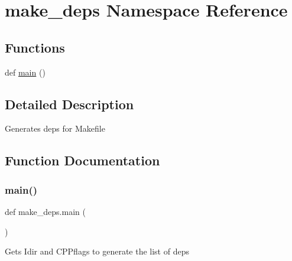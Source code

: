 \hypertarget{namespacemake__deps}{}\section{make\+\_\+deps Namespace Reference}
\label{namespacemake__deps}
\subsection*{Functions}
\begin{DoxyCompactItemize}
\item 
def \mbox{\hyperlink{namespacemake__deps_aba7f71c9c941e17bcbb41d4e5c46fef6}{main}} ()
\end{DoxyCompactItemize}


\subsection{Detailed Description}
\begin{DoxyVerb}Generates deps for Makefile
\end{DoxyVerb}
 

\subsection{Function Documentation}
\mbox{\label{namespacemake__deps_aba7f71c9c941e17bcbb41d4e5c46fef6}} 
\subsubsection{\texorpdfstring{main()}{main()}}
{\footnotesize\ttfamily def make\+\_\+deps.\+main (\begin{DoxyParamCaption}{ }\end{DoxyParamCaption})}

\begin{DoxyVerb}Gets Idir and CPPflags to generate the list of deps
\end{DoxyVerb}
 